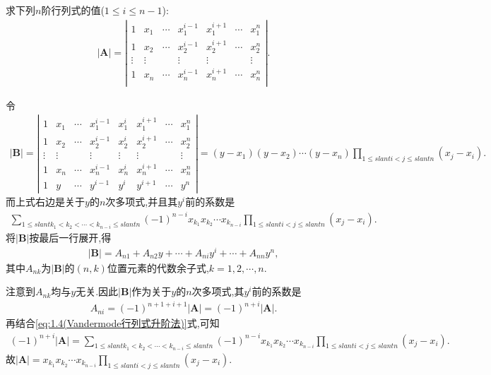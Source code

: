 \documentclass[../../main.tex]{subfiles}
\begin{document}
\begin{example}\label{升阶法的应用(2)例题}
求下列$n$阶行列式的值($1\le i\le n-1$):
\begin{align*}
|\boldsymbol{A}|=\left| \begin{matrix}
1&		x_1&		\cdots&		x_{1}^{i-1}&		x_{1}^{i+1}&		\cdots&		x_{1}^{n}\\
1&		x_2&		\cdots&		x_{2}^{i-1}&		x_{2}^{i+1}&		\cdots&		x_{2}^{n}\\
\vdots&		\vdots&		&		\vdots&		\vdots&		&		\vdots\\
1&		x_n&		\cdots&		x_{n}^{i-1}&		x_{n}^{i+1}&		\cdots&		x_{n}^{n}\\
\end{matrix} \right|.
\end{align*}
\end{example}
\begin{solution}
令
\begin{align}\label{eq:1.4(Vandermode行列式升阶法)}
|\boldsymbol{B}|=\left|\begin{matrix}
1 & x_1 & \cdots & x_{1}^{i - 1} & x_{1}^{i} & x_{1}^{i + 1} & \cdots & x_{1}^{n}\\
1 & x_2 & \cdots & x_{2}^{i - 1} & x_{2}^{i} & x_{2}^{i + 1} & \cdots & x_{2}^{n}\\
\vdots & \vdots &  & \vdots & \vdots & \vdots &  & \vdots\\
1 & x_n & \cdots & x_{n}^{i - 1} & x_{n}^{i} & x_{n}^{i + 1} & \cdots & x_{n}^{n}\\
1 & y & \cdots & y^{i - 1} & y^i & y^{i + 1} & \cdots & y^n
\end{matrix}\right|=(y - x_1)(y - x_2)\cdots (y - x_n)\prod_{1\leqslant slant i < j\leqslant slant n}(x_j - x_i).
\end{align}
而上式右边是关于\(y\)的\(n\)次多项式,并且其\(y^i\)前的系数是
\begin{align*}
\sum_{1\leqslant slant k_1 < k_2 < \cdots < k_{n - i}\leqslant slant n}(-1)^{n - i}x_{k_1}x_{k_2}\cdots x_{k_{n - i}}\prod_{1\leqslant slant i < j\leqslant slant n}(x_j - x_i).
\end{align*}
将\(|\boldsymbol{B}|\)按最后一行展开,得
\begin{align*}
|\boldsymbol{B}|=A_{n1} + A_{n2}y + \cdots + A_{ni}y^i + \cdots + A_{nn}y^n, 
\end{align*}
其中\(A_{nk}\)为\(|\boldsymbol{B}|\)的\((n,k)\)位置元素的代数余子式,\(k = 1,2,\cdots,n\).

注意到\(A_{nk}\)均与\(y\)无关.因此\(|\boldsymbol{B}|\)作为关于\(y\)的\(n\)次多项式,其\(y^i\)前的系数是
\begin{align*}
A_{ni}=(-1)^{n + 1 + i + 1}|\boldsymbol{A}|=(-1)^{n + i}|\boldsymbol{A}|.
\end{align*}
再结合\eqref{eq:1.4(Vandermode行列式升阶法)}式,可知
\begin{align*}
(-1)^{n + i}|\boldsymbol{A}|=\sum_{1\leqslant slant k_1 < k_2 < \cdots < k_{n - i}\leqslant slant n}(-1)^{n - i}x_{k_1}x_{k_2}\cdots x_{k_{n - i}}\prod_{1\leqslant slant i < j\leqslant slant n}(x_j - x_i). 
\end{align*}
故\(|\boldsymbol{A}|=x_{k_1}x_{k_2}\cdots x_{k_{n - i}}\prod_{1\leqslant slant i < j\leqslant slant n}(x_j - x_i)\).
\end{solution}
\end{document}
